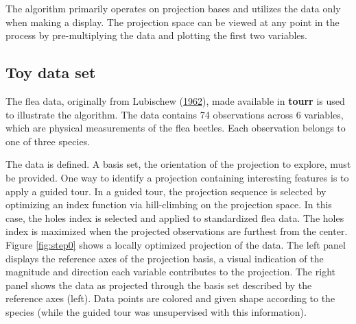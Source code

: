 The algorithm primarily operates on projection bases and utilizes the
data only when making a display. The projection space can be viewed at
any point in the process by pre-multiplying the data and plotting the
first two variables.

\hypertarget{toy-data-set}{%
\subsection{Toy data set}\label{toy-data-set}}

The flea data, originally from Lubischew
(\protect\hyperlink{ref-lubischew_use_1962}{1962}), made available in
\textbf{tourr} is used to illustrate the algorithm. The data contains 74
observations across 6 variables, which are physical measurements of the
flea beetles. Each observation belongs to one of three species.

The data is defined. A basis set, the orientation of the projection to
explore, must be provided. One way to identify a projection containing
interesting features is to apply a guided tour. In a guided tour, the
projection sequence is selected by optimizing an index function via
hill-climbing on the projection space. In this case, the holes index is
selected and applied to standardized flea data. The holes index is
maximized when the projected observations are furthest from the center.
Figure \ref{fig:step0} shows a locally optimized projection of the data.
The left panel displays the reference axes of the projection basis, a
visual indication of the magnitude and direction each variable
contributes to the projection. The right panel shows the data as
projected through the basis set described by the reference axes (left).
Data points are colored and given shape according to the species (while
the guided tour was unsupervised with this information).

